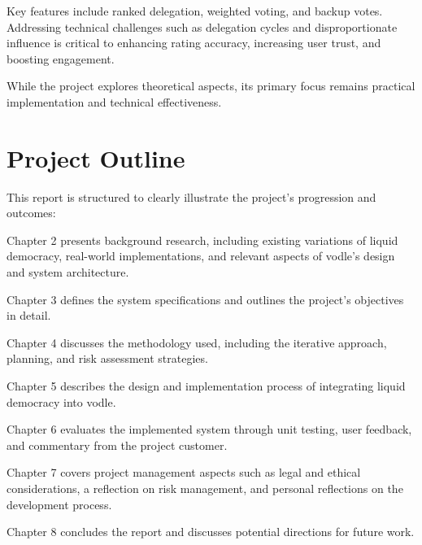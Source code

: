 Key features include ranked delegation, weighted voting, and backup votes. Addressing technical challenges such as delegation cycles and disproportionate influence is critical to enhancing rating accuracy, increasing user trust, and boosting engagement.

While the project explores theoretical aspects, its primary focus remains practical implementation and technical effectiveness.

\section{Project Outline}
This report is structured to clearly illustrate the project's progression and outcomes:

Chapter 2 presents background research, including existing variations of liquid democracy, real-world implementations, and relevant aspects of vodle's design and system architecture.

Chapter 3 defines the system specifications and outlines the project's objectives in detail.

Chapter 4 discusses the methodology used, including the iterative approach, planning, and risk assessment strategies.

Chapter 5 describes the design and implementation process of integrating liquid democracy into vodle.

Chapter 6 evaluates the implemented system through unit testing, user feedback, and commentary from the project customer.

Chapter 7 covers project management aspects such as legal and ethical considerations, a reflection on risk management, and personal reflections on the development process.

Chapter 8 concludes the report and discusses potential directions for future work.
